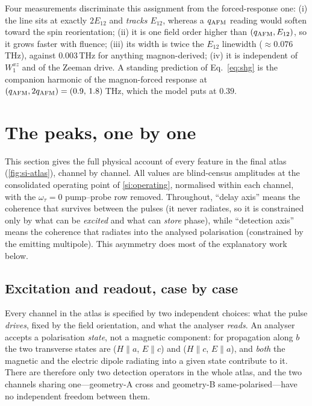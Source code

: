 \documentclass[11pt]{article}
\newcommand{\qafm}{q_{\rm AFM}}
\begin{document}
Four measurements discriminate this assignment from the
forced-response one: (i) the line sits at exactly $2E_{12}$ and
\emph{tracks $E_{12}$}, whereas a $\qafm$ reading would soften toward
the spin reorientation; (ii) it is one field order higher than
$(\qafm,E_{12})$, so it grows faster with fluence; (iii) its width is
twice the $E_{12}$ linewidth ($\approx0.076$\,THz), against
$0.003$\,THz for anything magnon-derived; (iv) it is independent of
$W^{xz}_1$ and of the Zeeman drive.  A standing prediction of
Eq.~\eqref{eq:shg} is the companion harmonic of the magnon-forced
response at $(\qafm,2\qafm)=(0.9,\,1.8)$\,THz, which the model puts at
$0.39$.

\section{The peaks, one by one}
\label{si:peakbypeak}

This section gives the full physical account of every feature in the
final atlas (\cref{fig:si-atlas}), channel by channel.  All values are
blind-census amplitudes at the consolidated operating point of
\cref{si:operating}, normalised within each channel, with the
$\omega_\tau=0$ pump--probe row removed.  Throughout, ``delay axis''
means the coherence that survives between the pulses (it never
radiates, so it is constrained only by what can be \emph{excited} and
what can \emph{store} phase), while ``detection axis'' means the
coherence that radiates into the analysed polarisation (constrained by
the emitting multipole).  This asymmetry does most of the explanatory
work below.

\subsection{Excitation and readout, case by case}
\label{si:whatsees}

Every channel in the atlas is specified by two independent choices: what
the pulse \emph{drives}, fixed by the field orientation, and what the
analyser \emph{reads}.  An analyser accepts a polarisation \emph{state},
not a magnetic component: for propagation along $b$ the two transverse
states are ($H\!\parallel\!a$, $E\!\parallel\!c$) and
($H\!\parallel\!c$, $E\!\parallel\!a$), and \emph{both} the magnetic and
the electric dipole radiating into a given state contribute to it.
There are therefore only two detection operators in the whole atlas, and
the two channels sharing one---geometry-A cross and geometry-B
same-polarised---have no independent freedom between them.
\end{document}
